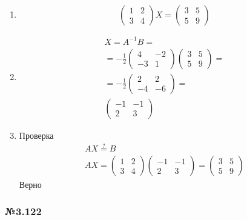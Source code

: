 \documentclass{article}
\begin{document}
\begin{enumerate}
	\item \[
	\begin{pmatrix}
		1 & 2 \\
		3 & 4
	\end{pmatrix} X =
	\begin{pmatrix}
		3 & 5 \\
		5 & 9
	\end{pmatrix}
	\]
	\item \begin{gather*}
		X = A^{-1} B = \\
		= -\frac{1}{2}
		\begin{pmatrix}
			4 & -2 \\
			-3 & 1
		\end{pmatrix}
		\begin{pmatrix}
			3 & 5 \\
			5 & 9
		\end{pmatrix} = \\
		= -\frac{1}{2}
		\begin{pmatrix}
			2 & 2 \\
			-4 & -6
		\end{pmatrix} = \\
		\begin{pmatrix}
			-1 & -1 \\
			2 & 3
		\end{pmatrix}
	\end{gather*}
	\item Проверка
	\begin{gather*}
		A X \stackrel{?}{=} B \\
		A X = \begin{pmatrix}
			1 & 2 \\
			3 & 4
		\end{pmatrix}
		\begin{pmatrix}
			-1 & -1 \\
			2 & 3
		\end{pmatrix}
		= \begin{pmatrix}
			3 & 5 \\
			5 & 9
		\end{pmatrix}
	\end{gather*}
	Верно
\end{enumerate}

\subsubsection*{№3.122}
\end{document}
